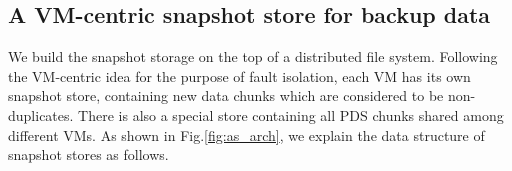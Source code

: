 

\subsection{A VM-centric snapshot store for backup data}

We build the snapshot storage on the top of a distributed file system.
Following the VM-centric idea for the purpose of fault isolation,
each VM has its own snapshot store, containing new data chunks which are considered
to be non-duplicates.
There is also a special store containing all PDS chunks shared among different VMs.
As shown in Fig.\ref{fig:as_arch}, we explain the data structure of snapshot stores as follows.

